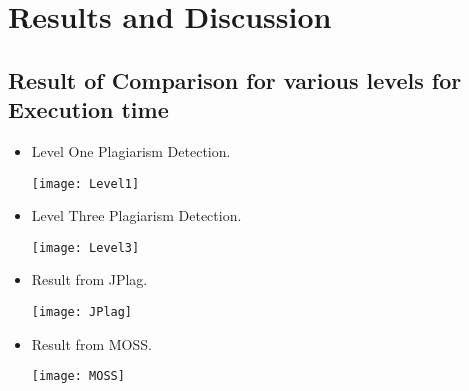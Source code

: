 \chapter{Results and Discussion }

\section{Result of Comparison for various levels for Execution time}
\begin{itemize}
\item Level One Plagiarism Detection.

  \texttt{[image: Level1]}
  \label{fig:Level1}

\item Level Three Plagiarism Detection.

  \texttt{[image: Level3]}
  \label{fig:Level3}
  
\item Result from JPlag.



  \texttt{[image: JPlag]}
  \label{fig:JPlag}
  
  
  
\item Result from MOSS.



  \texttt{[image: MOSS]}
  \label{fig:MOSS}


\end{itemize}
